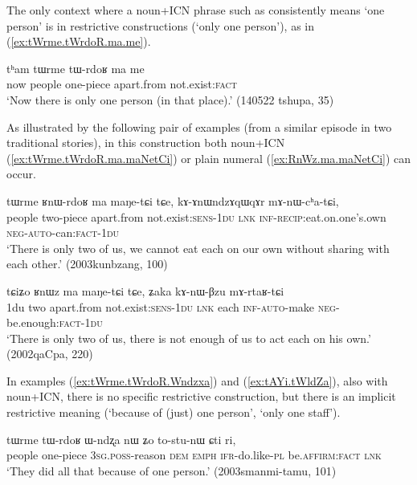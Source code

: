 The only context where a noun+ICN phrase such as  consistently means `one person' is in restrictive constructions (`only one person'), as in (\ref{ex:tWrme.tWrdoR.ma.me}).  

\begin{exe}
\ex \label{ex:tWrme.tWrdoR.ma.me}
\gll tʰam tɯrme tɯ-rdoʁ ma me \\
now people one-piece apart.from not.exist:\textsc{fact} \\
\glt `Now there is only one person (in that place).' (140522 tshupa, 35)
\end{exe} 

As illustrated by the following pair of examples (from a similar episode in two traditional stories), in this construction both noun+ICN  (\ref{ex:tWrme.tWrdoR.ma.maNetCi})  or plain numeral (\ref{ex:RnWz.ma.maNetCi}) can occur.

\begin{exe}
\ex \label{ex:tWrme.tWrdoR.ma.maNetCi}
\gll tɯrme ʁnɯ-rdoʁ ma maŋe-tɕi tɕe, kɤ-ɤnɯndzɤqɯqɤr mɤ-nɯ-cʰa-tɕi, \\
people two-piece apart.from not.exist:\textsc{sens}-\textsc{1du} \textsc{lnk} \textsc{inf}-\textsc{recip}:eat.on.one's.own \textsc{neg}-\textsc{auto}-can:\textsc{fact}-\textsc{1du} \\
\glt `There is only two of us, we cannot eat each on our own without sharing with each other.' (2003kunbzang, 100)
\end{exe} 

\begin{exe}
\ex \label{ex:RnWz.ma.maNetCi}
\gll  tɕiʑo ʁnɯz ma maŋe-tɕi tɕe, ʑaka kɤ-nɯ-βzu mɤ-rtaʁ-tɕi \\
1du two apart.from not.exist:\textsc{sens}-\textsc{1du} \textsc{lnk} each \textsc{inf}-\textsc{auto}-make \textsc{neg}-be.enough:\textsc{fact}-\textsc{1du} \\
\glt  `There is only two of us, there is not enough of us to act each on his own.' (2002qaCpa, 220)
\end{exe} 

In examples (\ref{ex:tWrme.tWrdoR.Wndzxa}) and (\ref{ex:tAYi.tWldZa}), also with noun+ICN, there is no specific restrictive construction, but there is an implicit restrictive meaning (`because of (just) one person', `only one staff'). 

\begin{exe}
\ex \label{ex:tWrme.tWrdoR.Wndzxa}
\gll tɯrme tɯ-rdoʁ ɯ-ndʐa nɯ ʑo to-stu-nɯ ɕti ri, \\
people one-piece  \textsc{3sg}.\textsc{poss}-reason \textsc{dem} \textsc{emph} \textsc{ifr}-do.like-\textsc{pl} be.\textsc{affirm}:\textsc{fact} \textsc{lnk} \\
\glt `They did all that because of one person.' (2003smanmi-tamu, 101)
\end{exe} 

